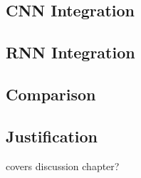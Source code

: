 \subsection{\gls{CNN} Integration}

\subsection{\gls{RNN} Integration}

\subsection{Comparison}

\subsection{Justification}

covers discussion chapter?
